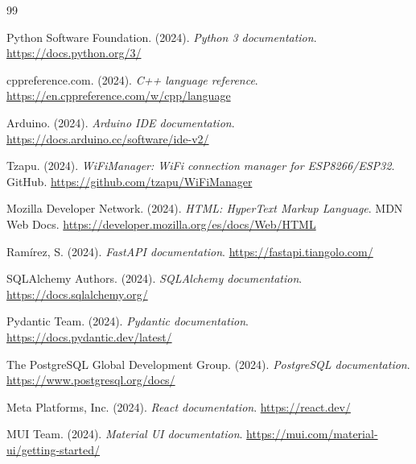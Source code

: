\clearpage
{}
\renewcommand{\bibname}{Cibergrafía}

\begin{thebibliography}{99}


    Python Software Foundation. (2024). \textit{Python 3 documentation}.
    \url{https://docs.python.org/3/}

    cppreference.com. (2024). \textit{C++ language reference}.
    \url{https://en.cppreference.com/w/cpp/language}

    Arduino. (2024). \textit{Arduino IDE documentation}.
    \url{https://docs.arduino.cc/software/ide-v2/}

    Tzapu. (2024). \textit{WiFiManager: WiFi connection manager for ESP8266/ESP32}. GitHub.
    \url{https://github.com/tzapu/WiFiManager}

    Mozilla Developer Network. (2024). \textit{HTML: HyperText Markup Language}. MDN Web Docs.
    \url{https://developer.mozilla.org/es/docs/Web/HTML}


    Ramírez, S. (2024). \textit{FastAPI documentation}.
    \url{https://fastapi.tiangolo.com/}

    SQLAlchemy Authors. (2024). \textit{SQLAlchemy documentation}.
    \url{https://docs.sqlalchemy.org/}

    Pydantic Team. (2024). \textit{Pydantic documentation}.
    \url{https://docs.pydantic.dev/latest/}


    The PostgreSQL Global Development Group. (2024). \textit{PostgreSQL documentation}.
    \url{https://www.postgresql.org/docs/}


    Meta Platforms, Inc. (2024). \textit{React documentation}.
    \url{https://react.dev/}

    MUI Team. (2024). \textit{Material UI documentation}.
    \url{https://mui.com/material-ui/getting-started/}


\end{thebibliography}
